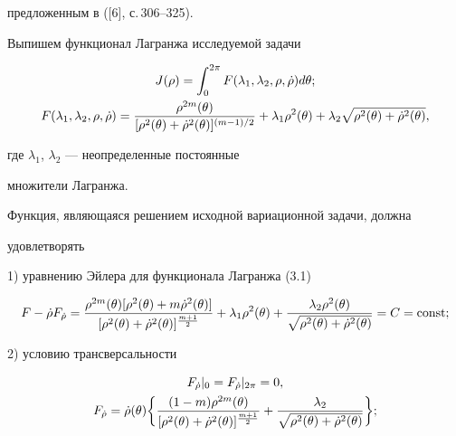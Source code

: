 предложенным в ([6], с.\,306--325).


Выпишем функционал Лагранжа исследуемой задачи


\begin{gather}


J(\rho) = \int_0^{2 \pi}


F(\lambda_1, \lambda_2, \rho, \Dot{\rho}) d\theta;\\


F(\lambda_1, \lambda_2, \rho, \Dot{\rho}) = \frac


{\rho^{2m}(\theta)}


{[\rho^2 (\theta) + \Dot{\rho}^2 (\theta) ]^{(m-1)/2}}


+ \lambda_1 \rho^2 (\theta) +


\lambda_2 \sqrt {\rho^2 (\theta) +


\Dot{\rho}^2 (\theta)},\notag


\end{gather}


где $\lambda_1$, $\lambda_2$ --- неопределенные постоянные


множители Лагранжа.





Функция, являющаяся решением исходной вариационной задачи, должна


удовлетворять





1) уравнению Эйлера для функционала Лагранжа (3.1)


\begin{equation}


F - \Dot{\rho} F_{\Dot{\rho}} =


\frac {\rho^{2m}(\theta) [\rho^2(\theta) + m \Dot{\rho}^2(\theta)]}


{[\rho^2(\theta) + \Dot{\rho}^2(\theta)]^{\frac {m+1}{2}}} +


\lambda_1 \rho^2(\theta) +


\frac {\lambda_2 \rho^2(\theta)}


{\sqrt{\rho^2(\theta) + \Dot{\rho}^2(\theta)}} = C =\const;


\end{equation}





2) условию трансверсальности


\begin{gather}


F_{\Dot{\rho}} |_0 =


F_{\Dot{\rho}} |_{2\pi} = 0,\\


F_{\Dot{\rho}} = \Dot{\rho}(\theta) \bigg\{


\frac {(1 - m) \rho^{2m}(\theta)}


{[\rho^2(\theta) + \Dot{\rho}^2(\theta)]^{\frac {m+1}{2}}} +


\frac {\lambda_2}{\sqrt{\rho^2(\theta) + \Dot{\rho}^2(\theta)}}


\bigg\};\notag


\end{gather}






